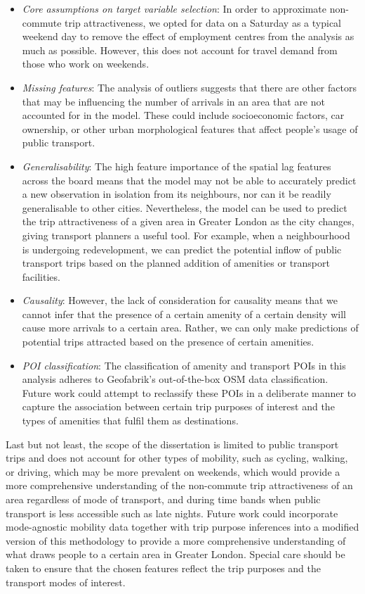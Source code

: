 \begin{itemize}
    \setlength\itemsep{0em}
    \item \textit{Core assumptions on target variable selection}: In order to approximate non-commute trip attractiveness, we opted for data on a Saturday as a typical weekend day to remove the effect of employment centres from the analysis as much as possible. However, this does not account for travel demand from those who work on weekends. 
    \item \textit{Missing features}: The analysis of outliers suggests that there are other factors that may be influencing the number of arrivals in an area that are not accounted for in the model. These could include socioeconomic factors, car ownership, or other urban morphological features that affect people's usage of public transport.
    \item \textit{Generalisability}: The high feature importance of the spatial lag features across the board means that the model may not be able to accurately predict a new observation in isolation from its neighbours, nor can it be readily generalisable to other cities. Nevertheless, the model can be used to predict the trip attractiveness of a given area in Greater London as the city changes, giving transport planners a useful tool. For example, when a neighbourhood is undergoing redevelopment, we can predict the potential inflow of public transport trips based on the planned addition of amenities or transport facilities.
    \item \textit{Causality}: However, the lack of consideration for causality means that we cannot infer that the presence of a certain amenity of a certain density will cause more arrivals to a certain area. Rather, we can only make predictions of potential trips attracted based on the presence of certain amenities.
    \item \textit{POI classification}: The classification of amenity and transport POIs in this analysis adheres to Geofabrik's out-of-the-box OSM data classification. Future work could attempt to reclassify these POIs in a deliberate manner to capture the association between certain trip purposes of interest and the types of amenities that fulfil them as destinations.
\end{itemize}

Last but not least, the scope of the dissertation is limited to public transport trips and does not account for other types of mobility, such as cycling, walking, or driving, which may be more prevalent on weekends, which would provide a more comprehensive understanding of the non-commute trip attractiveness of an area regardless of mode of transport, and during time bands when public transport is less accessible such as late nights. Future work could incorporate mode-agnostic mobility data together with trip purpose inferences into a modified version of this methodology to provide a more comprehensive understanding of what draws people to a certain area in Greater London. Special care should be taken to ensure that the chosen features reflect the trip purposes and the transport modes of interest.